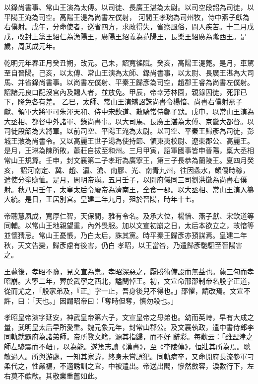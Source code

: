 \begin{pinyinscope}
 以錄尚書事、常山王演為太傅。以司徒、長廣王湛為太尉。以司空段韶為司徒，以平陽王淹為司空。高陽王湜為尚書左僕射，
 河間王孝琬為司州牧，侍中燕子獻為右僕射。戊午，分命使者，巡省四方，求政得失，省察風俗，問人疾苦。十二月戊戌，改封上黨王紹仁為漁陽王，廣陽王紹義為范陽王，長樂王紹廣為隴西王。是歲，周武成元年。



 乾明元年春正月癸丑朔，改元。己未，詔寬徭賦。癸亥，高陽王湜薨。是月，車駕至自晉陽。己亥，以太傅、常山王演為太師、錄尚書事，以太尉、長廣王湛為大司馬、并省錄尚書事。以尚書左僕射、平秦王歸彥為司空，趙郡王睿為尚書左僕射。詔諸元良口配沒宮內及賜人者，並放免。甲辰，帝幸芳林園，親錄囚徒，死罪已下，降免各有差。
 乙巳，太師、常山王演矯詔誅尚書令楊愔、尚書右僕射燕子獻、領軍大將軍可朱渾天和、侍中宋欽道、散騎常侍鄭子默。戊申，以常山王演為大丞相、都督中外諸軍、錄尚書事。以大司馬、長廣王湛為太傅、京畿大都督。以司徒段韶為大將軍。以前司空、平陽王淹為太尉。以司空、平秦王歸彥為司徒，彭城王浟為尚書令。又以高麗王世子湯為使持節、領東夷校尉、遼東郡公、高麗王。是月，王琳為陳所敗，蕭莊自拔至和州。三月甲寅，詔軍國事皆申晉陽，稟大丞相常山王規算。壬申，封文襄第二子孝珩為廣寧王，第三子長恭為蘭陵王。夏四月癸亥，
 詔河南定、冀、趙、瀛、滄、南膠、光、南青九州，往因螽水，頗傷時稼，遣使分塗贍恤。是月，周明帝崩。五月壬子，以開府儀同三司劉洪徽為尚書右僕射。秋八月壬午，太皇太后令廢帝為濟南王，全食一郡。以大丞相、常山王演入纂大統。是日，王居別宮。皇建二年九月，殂於晉陽，時年十七。



 帝聰慧夙成，寬厚仁智，天保間，雅有令名。及承大位，楊愔、燕子獻、宋欽道等同輔。以常山王地親望重，內外畏服。加以文宣初崩之日，太后本欲立之，故愔等並懷猜忌。常山王憂悵，乃白太后，誅其黨。時平秦王歸彥亦預謀焉。皇建二年秋，天文告變，歸彥慮有後害，仍白
 孝昭，以王當咎，乃遣歸彥馳駟至晉陽害之。



 王薨後，孝昭不豫，見文宣為祟。孝昭深惡之，厭勝術備設而無益也。薨三旬而孝昭崩。大寧二年，葬於武寧之西北，謚閔悼王。初，文宣命邢邵制帝名殷字正道，從而尤之，「殷家弟及，『正』字一止，吾身後兒不得也。」邵懼，請改焉。文宣不許，曰：「天也。」因謂昭帝曰：「奪時但奪，慎勿殺也。」



 孝昭皇帝演字延安，神武皇帝第六子，文宣皇帝之母弟也。幼而英峙，早有大成之量，武明皇太后早所愛重。魏元象元年，封常山郡公。及文襄執政，遣中書侍郎李同軌就霸府為諸弟師。帝所覽文籍，源其指歸，而不好
 辭彩。每歎云：「雖盟津之師左驂震而不衄」，以為能。遂篤志讀《漢書》，至《李陵傳》，恒壯其所為焉。聰敏過人。所與游處，一知其家諱，終身未嘗誤犯。同軌病卒，又命開府長流參軍刁柔代之，性嚴褊，不適誘訓之宜，中被遣出。帝送出閣，慘然斂容，淚數行下，左右莫不歔欷。其敬業重舊如此。




\end{pinyinscope}
